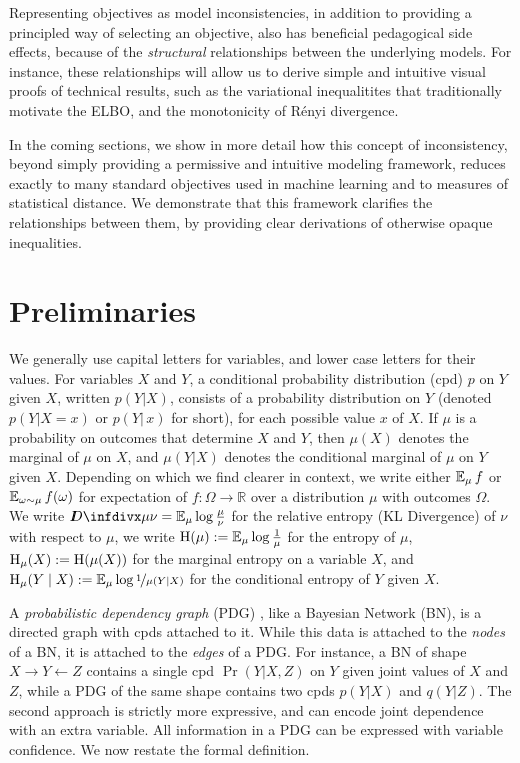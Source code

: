 Representing objectives as model inconsistencies, in addition to providing a principled way of selecting an objective, also has beneficial pedagogical side effects, because of the \emph{structural} relationships between the underlying models.
For instance, these relationships will allow us to derive
simple and intuitive visual proofs of technical results,
such as the variational inequalitites that traditionally motivate the ELBO,
and the monotonicity of R\'enyi divergence.



In the coming sections, we show in more detail how this concept of inconsistency, beyond simply providing a permissive and intuitive modeling framework, reduces exactly to many standard objectives used in machine learning and to measures of statistical distance.
 We demonstrate that this framework clarifies the relationships between them, by providing clear derivations of otherwise opaque inequalities.



\section{Preliminaries}
We generally use capital letters for variables, and lower case letters for their values.
For variables $X$ and $Y$, a conditional probability distribution (cpd) $p$ on $Y$ given $X$, written $p(Y|X)$, consists of a probability distribution on $Y$ (denoted $p(Y| X\!=\!x)$ or $p(Y|\,x)$ for short), for each possible value $x$ of $X$.
If $\mu$ is a probability on outcomes that determine $X$ and $Y$,
then $\mu(X)$ denotes the marginal of $\mu$ on $X$, and $\mu(Y|X)$
denotes the conditional marginal of $\mu$ on  $Y$ given $X$.
Depending on which we find clearer in context, we write either $\operatorname*{\mathbb{E}}_\mu f$ or $\operatorname*{\mathbb{E}}_{\omega \sim \mu} f(\omega)$ for expectation of $f : \Omega \to \mathbb R$ over a distribution $\mu$ with outcomes $\Omega$.
We write $\kldiv\mu\nu = \Ex_\mu \log \frac{\mu}{\nu}$ for the relative entropy (KL Divergence) of $\nu$ with respect to $\mu$,
we write $\operatorname{\mathrm{H}}(\mu) := \operatorname*{\mathbb{E}}_\mu \log\frac1\mu$ for the entropy of $\mu$, $\operatorname{\mathrm{H}}_\mu(X):= \operatorname{\mathrm{H}}(\mu(X))$ for the marginal entropy on a variable $X$, and $\operatorname{\mathrm{H}}_\mu(Y \mid X):= \operatorname*{\mathbb{E}}_\mu \log \nicefrac1{\mu(Y|X)}$ for the conditional entropy of $Y$ given $X$.

A \emph{probabilistic dependency graph} (PDG)
\parencite{pdg-aaai}, like a Bayesian Network (BN), is a
directed graph with cpds attached to it. While this data is attached
to the \emph{nodes} of a BN, it is attached to the \emph{edges} of a PDG.
For instance, a BN of shape
$ X \!\to\! Y \!\leftarrow\! Z $
contains a single cpd $\Pr(Y | X,Z)$ on $Y$ given joint values of $X$ and $Z$,
while a PDG of the same shape contains two cpds $p(Y | X)$ and $q(Y | Z)$.
The second approach is strictly more expressive, and can encode joint dependence with an extra variable.
All information in a PDG can be expressed with variable confidence.
We now restate the formal definition.

